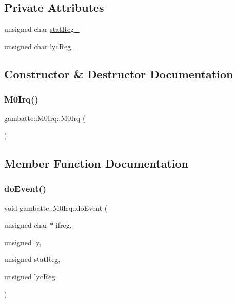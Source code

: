 \subsection*{Private Attributes}
\begin{DoxyCompactItemize}
\item 
unsigned char \hyperlink{classgambatte_1_1M0Irq_adfa7fb60ef9478d0e2abc29d9c0c0271}{stat\+Reg\+\_\+}
\item 
unsigned char \hyperlink{classgambatte_1_1M0Irq_a966c4c53ab37b6eaf71ceea852f9b89f}{lyc\+Reg\+\_\+}
\end{DoxyCompactItemize}


\subsection{Constructor \& Destructor Documentation}
\mbox{\label{classgambatte_1_1M0Irq_acb6a23bd7dc6672a0f283fe5eec37c77}} 
\subsubsection{\texorpdfstring{M0\+Irq()}{M0Irq()}}
{\footnotesize\ttfamily gambatte\+::\+M0\+Irq\+::\+M0\+Irq (\begin{DoxyParamCaption}{ }\end{DoxyParamCaption})\hspace{0.3cm}{\ttfamily [inline]}}



\subsection{Member Function Documentation}
\mbox{\label{classgambatte_1_1M0Irq_af973cffcea506772d502c1286161a668}} 
\subsubsection{\texorpdfstring{do\+Event()}{doEvent()}}
{\footnotesize\ttfamily void gambatte\+::\+M0\+Irq\+::do\+Event (\begin{DoxyParamCaption}\item[{unsigned char $\ast$}]{ifreg,  }\item[{unsigned}]{ly,  }\item[{unsigned}]{stat\+Reg,  }\item[{unsigned}]{lyc\+Reg }\end{DoxyParamCaption})\hspace{0.3cm}{\ttfamily [inline]}}

